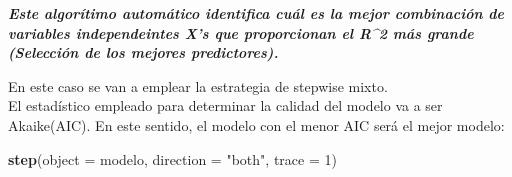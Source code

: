 \documentclass[]{article}
\newenvironment{Shaded}{\begin{snugshade}}{\end{snugshade}}
\newcommand{\KeywordTok}[1]{\textcolor[rgb]{0.13,0.29,0.53}{\textbf{#1}}}
\newcommand{\DataTypeTok}[1]{\textcolor[rgb]{0.13,0.29,0.53}{#1}}
\newcommand{\DecValTok}[1]{\textcolor[rgb]{0.00,0.00,0.81}{#1}}
\newcommand{\StringTok}[1]{\textcolor[rgb]{0.31,0.60,0.02}{#1}}
\newcommand{\NormalTok}[1]{#1}
\begin{document}
\emph{\textbf{Este algorítimo automático identifica cuál es la mejor
combinación de variables independeintes X's que proporcionan el R\^{}2
más grande (Selección de los mejores predictores).}}

En este caso se van a emplear la estrategia de stepwise mixto.\\
El estadístico empleado para determinar la calidad del modelo va a ser
Akaike(AIC). En este sentido, el modelo con el menor AIC será el mejor
modelo:

\begin{Shaded}
\begin{Highlighting}[]
\KeywordTok{step}\NormalTok{(}\DataTypeTok{object =}\NormalTok{ modelo, }\DataTypeTok{direction =} \StringTok{"both"}\NormalTok{, }\DataTypeTok{trace =} \DecValTok{1}\NormalTok{)}
\end{Highlighting}
\end{Shaded}
\end{document}
